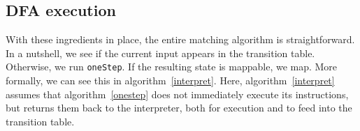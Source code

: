 \documentclass[english]{sigplanconf}
\theoremstyle{definition}
\newtheorem{example}{Example}[section]
\begin{document}
%
%
%

\subsection{DFA execution}
With these ingredients in place, the entire matching algorithm is
straightforward.  In a nutshell, we see if the current input appears
in the transition table. Otherwise, we run \texttt{oneStep}. If the
resulting state is mappable, we map.  More formally, we can see
this in algorithm~\ref{interpret}. Here, algorithm~\ref{interpret} 
assumes that algorithm~\ref{onestep} does not immediately execute 
its instructions, but returns them back to the interpreter, both for 
execution and to feed into the transition table.
\end{document}
